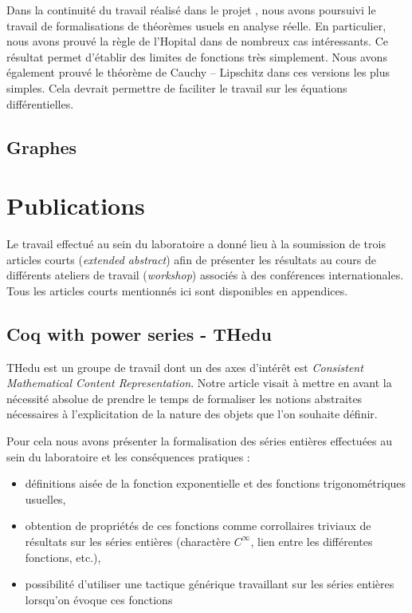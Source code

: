 \documentclass[11pt]{article}
\begin{document}
Dans la continuité du travail réalisé dans le projet \coquille{}, nous avons
poursuivi le travail de formalisations de théorèmes usuels en analyse réelle.
En particulier, nous avons prouvé la règle de l'Hopital dans de nombreux cas
intéressants. Ce résultat permet d'établir des limites de fonctions très simplement.
Nous avons également prouvé le théorème de Cauchy -- Lipschitz dans ces versions les
plus simples. Cela devrait permettre de faciliter le travail sur les équations
différentielles.

\subsection{Graphes}

\section{Publications}

Le travail effectué au sein du laboratoire \coqtail{} a donné lieu à la soumission
de trois articles courts (\textit{extended abstract}) afin de présenter les résultats
au cours de différents ateliers de travail (\textit{workshop}) associés à des
conférences internationales. Tous les articles courts mentionnés ici sont disponibles
en appendices.

\subsection{Coq with power series - THedu}

THedu est un groupe de travail dont un des axes d'intérêt est \textit{Consistent
Mathematical Content Representation}. Notre article visait à mettre en avant la
nécessité absolue de prendre le temps de formaliser les notions abstraites nécessaires
à l'explicitation de la nature des objets que l'on souhaite définir.

Pour cela nous avons présenter la formalisation des séries entières effectuées au
sein du laboratoire et les conséquences pratiques :
\begin{itemize}
 \item définitions aisée de la fonction exponentielle et des fonctions
 trigonométriques usuelles,
 \item obtention de propriétés de ces fonctions comme corrollaires triviaux
 de résultats sur les séries entières (charactère $C^{\infty}$, lien entre les
 différentes fonctions, etc.),
 \item possibilité d'utiliser une tactique générique travaillant sur les séries
 entières lorsqu'on évoque ces fonctions
\end{itemize}
\end{document}
